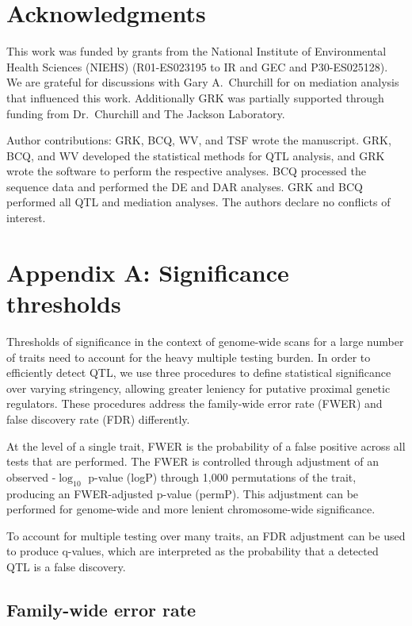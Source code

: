 \documentclass[9pt,twocolumn,twoside]{gsajnl}
\begin{document}
\section{Acknowledgments}
This work was funded by grants from the National Institute of Environmental Health Sciences (NIEHS) (R01-ES023195 to IR and GEC and P30-ES025128). We are grateful for discussions with Gary A.\ Churchill for on mediation analysis that influenced this work. Additionally GRK was partially supported through funding from Dr.\ Churchill and The Jackson Laboratory.

Author contributions: GRK, BCQ, WV, and TSF wrote the manuscript. GRK, BCQ, and WV developed the statistical methods for QTL analysis, and GRK wrote the software to perform the respective analyses. BCQ processed the sequence data and performed the DE and DAR analyses. GRK and BCQ performed all QTL and mediation analyses. The authors declare no conflicts of interest.



\clearpage

\section{Appendix A: Significance thresholds}

Thresholds of significance in the context of genome-wide scans for a large number of traits need to account for the heavy multiple testing burden. In order to efficiently detect QTL, we use three procedures to define statistical significance over varying stringency, allowing greater leniency for putative proximal genetic regulators. These procedures address the family-wide error rate (FWER) and false discovery rate (FDR) differently.

At the level of a single trait, FWER is the probability of a false positive across all tests that are performed. The FWER is controlled through adjustment of an observed -$\log_{10}$ p-value (logP) through 1,000 permutations of the trait, producing an FWER-adjusted p-value (permP). This adjustment can be performed for genome-wide and more lenient chromosome-wide significance.

To account for multiple testing over many traits, an FDR adjustment \citep{Benjamini1995} can be used to produce q-values, which are interpreted as the probability that a detected QTL is a false discovery. 

\subsection{Family-wide error rate}
\end{document}
